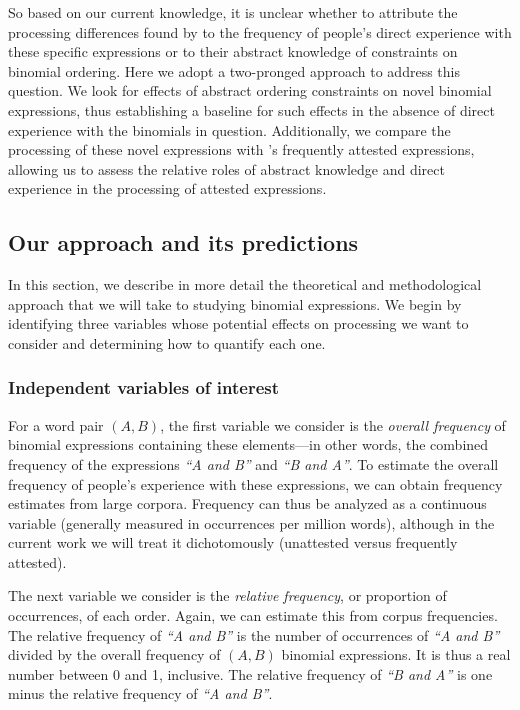 \documentclass[authoryear]{elsarticle}
\begin{document}
So based on our current knowledge, it is unclear whether to attribute the processing differences found by \citeauthor{SiyanovaChanturia:2011ep} to the frequency of people's direct experience with these specific expressions or to their abstract knowledge of constraints on binomial ordering. Here we adopt a two-pronged approach to address this question. We look for effects of abstract ordering constraints on novel binomial expressions, thus establishing a baseline for such effects in the absence of direct experience with the binomials in question. Additionally, we compare the processing of these novel expressions with \citeauthor{SiyanovaChanturia:2011ep}'s frequently attested expressions, allowing us to assess the relative roles of abstract knowledge and direct experience in the processing of attested expressions. 


\subsection{Our approach and its predictions}

In this section, we describe in more detail the theoretical and methodological approach that we will take to studying binomial expressions. We begin by identifying three variables whose potential effects on processing we want to consider and determining how to quantify each one.



\subsubsection{Independent variables of interest}\label{ivs}

For a word pair $(A,B)$, the first variable we consider is the \emph{overall frequency} of binomial expressions containing these elements---in other words, the combined frequency of the expressions \emph{``A and B''} and \emph{``B and A''}. To estimate the overall frequency of people's experience with these expressions, we can obtain frequency estimates from large corpora. Frequency can thus be analyzed as a continuous variable (generally measured in occurrences per million words), although in the current work we will treat it dichotomously (unattested versus frequently attested).

The next variable we consider is the \emph{relative frequency}, or proportion of occurrences, of each order. Again, we can estimate this from corpus frequencies. The relative frequency of \emph{``A and B''} is the number of occurrences of \emph{``A and B''} divided by the overall frequency of $(A,B)$ binomial expressions. It is thus a real number between 0 and 1, inclusive. The relative frequency of \emph{``B and A''} is one minus the relative frequency of \emph{``A and B''}.
\end{document}

